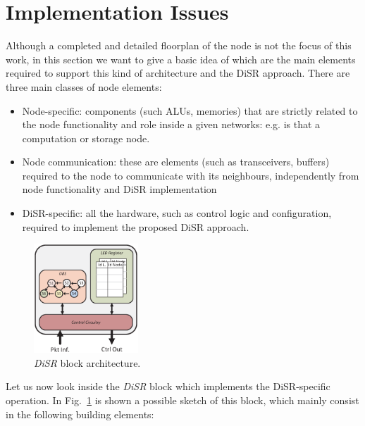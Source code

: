 
\section{Implementation Issues}

\label{sec:implementation}
Although a completed and detailed floorplan of the node is not the
focus of this work, in this section we want to give a basic idea of
which are the main elements required to support this kind of
architecture and the DiSR approach. There are three main classes of
node elements:
\begin{itemize}
\item Node-specific: components (such ALUs, memories) that are
strictly related to the node functionality and role inside a given
networks: e.g. is that a computation or storage node.
\item Node communication:  these are elements (such as transceivers,
buffers) required to the node to communicate with its neighbours,
independently from node functionality and DiSR implementation
\item DiSR-specific: all the hardware, such as control logic and
configuration, required to implement the proposed DiSR approach.
\end{itemize}


\begin{figure}
  \centering
  \includegraphics[width=0.35\textwidth]{pictures/disr_imp.eps}
  \caption{\emph{DiSR} block architecture.}
 \label{fig:implementation}
\end{figure}



Let us now look inside the \emph{DiSR} block which implements the DiSR-specific
operation. In Fig.~\ref{fig:implementation} is shown a possible sketch of this 
block, which mainly consist in the following building elements:

